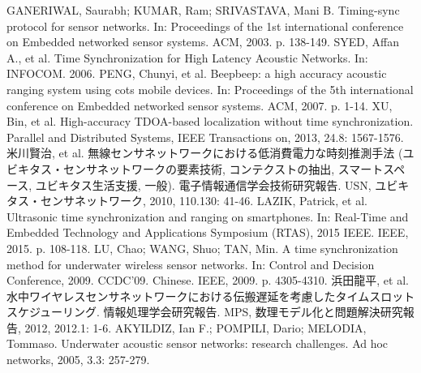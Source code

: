 \begin{thebibliography}{99}
      GANERIWAL, Saurabh; KUMAR, Ram; SRIVASTAVA, Mani B. Timing-sync protocol for sensor networks. In: Proceedings of the 1st international conference on Embedded networked sensor systems. ACM, 2003. p. 138-149.
 SYED, Affan A., et al. Time Synchronization for High Latency Acoustic Networks. In: INFOCOM. 2006.
 PENG, Chunyi, et al. Beepbeep: a high accuracy acoustic ranging system using cots mobile devices. In: Proceedings of the 5th international conference on Embedded networked sensor systems. ACM, 2007. p. 1-14.
 XU, Bin, et al. High-accuracy TDOA-based localization without time synchronization. Parallel and Distributed Systems, IEEE Transactions on, 2013, 24.8: 1567-1576.
 米川賢治, et al. 無線センサネットワークにおける低消費電力な時刻推測手法 (ユビキタス・センサネットワークの要素技術, コンテクストの抽出, スマートスペース, ユビキタス生活支援, 一般). 電子情報通信学会技術研究報告. USN, ユビキタス・センサネットワーク, 2010, 110.130: 41-46.
 LAZIK, Patrick, et al. Ultrasonic time synchronization and ranging on smartphones. In: Real-Time and Embedded Technology and Applications Symposium (RTAS), 2015 IEEE. IEEE, 2015. p. 108-118.
 LU, Chao; WANG, Shuo; TAN, Min. A time synchronization method for underwater wireless sensor networks. In: Control and Decision Conference, 2009. CCDC'09. Chinese. IEEE, 2009. p. 4305-4310.
 浜田龍平, et al. 水中ワイヤレスセンサネットワークにおける伝搬遅延を考慮したタイムスロットスケジューリング. 情報処理学会研究報告. MPS, 数理モデル化と問題解決研究報告, 2012, 2012.1: 1-6.
 AKYILDIZ, Ian F.; POMPILI, Dario; MELODIA, Tommaso. Underwater acoustic sensor networks: research challenges. Ad hoc networks, 2005, 3.3: 257-279.



\end{thebibliography}
